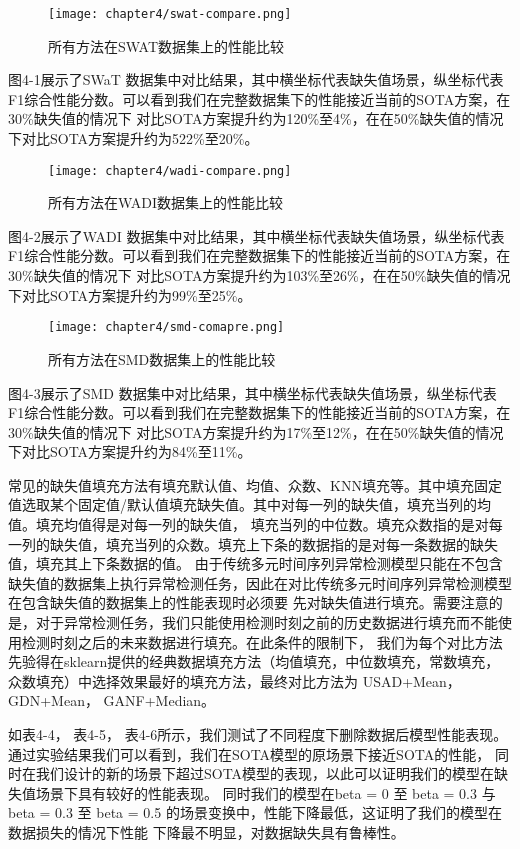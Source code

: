 \begin{figure}[htb]
  \centering
  \texttt{[image: chapter4/swat-compare.png]}
  \caption{所有方法在SWAT数据集上的性能比较}
  \end{figure}

图4-1展示了SWaT 数据集中对比结果，其中横坐标代表缺失值场景，纵坐标代表F1综合性能分数。可以看到我们在完整数据集下的性能接近当前的SOTA方案，在30\%缺失值的情况下
对比SOTA方案提升约为120\%至4\%，在在50\%缺失值的情况下对比SOTA方案提升约为522\%至20\%。

\begin{figure}[htb]
  \centering
  \texttt{[image: chapter4/wadi-compare.png]}
  \caption{所有方法在WADI数据集上的性能比较}
  \end{figure}

图4-2展示了WADI 数据集中对比结果，其中横坐标代表缺失值场景，纵坐标代表F1综合性能分数。可以看到我们在完整数据集下的性能接近当前的SOTA方案，在30\%缺失值的情况下
对比SOTA方案提升约为103\%至26\%，在在50\%缺失值的情况下对比SOTA方案提升约为99\%至25\%。

\begin{figure}[htb]
  \centering
  \texttt{[image: chapter4/smd-comapre.png]}
  \caption{所有方法在SMD数据集上的性能比较}
  \end{figure}
图4-3展示了SMD 数据集中对比结果，其中横坐标代表缺失值场景，纵坐标代表F1综合性能分数。可以看到我们在完整数据集下的性能接近当前的SOTA方案，在30\%缺失值的情况下
对比SOTA方案提升约为17\%至12\%，在在50\%缺失值的情况下对比SOTA方案提升约为84\%至11\%。


常见的缺失值填充方法有填充默认值、均值、众数、KNN填充等。其中填充固定值选取某个固定值/默认值填充缺失值。其中对每一列的缺失值，填充当列的均值。填充均值得是对每一列的缺失值，
填充当列的中位数。填充众数指的是对每一列的缺失值，填充当列的众数。填充上下条的数据指的是对每一条数据的缺失值，填充其上下条数据的值。
由于传统多元时间序列异常检测模型只能在不包含缺失值的数据集上执行异常检测任务，因此在对比传统多元时间序列异常检测模型在包含缺失值的数据集上的性能表现时必须要
先对缺失值进行填充。需要注意的是，对于异常检测任务，我们只能使用检测时刻之前的历史数据进行填充而不能使用检测时刻之后的未来数据进行填充。在此条件的限制下，
我们为每个对比方法先验得在sklearn提供的经典数据填充方法（均值填充，中位数填充，常数填充，众数填充）中选择效果最好的填充方法，最终对比方法为 
USAD+Mean， GDN+Mean， GANF+Median。

如表4-4， 表4-5， 表4-6所示，我们测试了不同程度下删除数据后模型性能表现。通过实验结果我们可以看到，我们在SOTA模型的原场景下接近SOTA的性能，
同时在我们设计的新的场景下超过SOTA模型的表现，以此可以证明我们的模型在缺失值场景下具有较好的性能表现。
同时我们的模型在beta = 0 至 beta = 0.3 与 beta = 0.3 至 beta = 0.5 的场景变换中，性能下降最低，这证明了我们的模型在数据损失的情况下性能
下降最不明显，对数据缺失具有鲁棒性。

